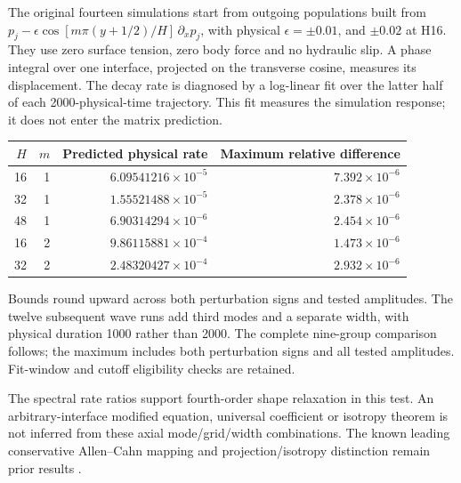 The original fourteen simulations start from outgoing populations built from
$p_j-\epsilon\cos[m\pi(y+1/2)/H]\,\partial_xp_j$, with physical
$\epsilon=\pm0.01$, and $\pm0.02$ at H16. They use zero surface tension,
zero body force and no hydraulic slip. A phase integral over one interface,
projected on the transverse cosine, measures its displacement. The decay
rate is diagnosed by a log-linear fit over the latter half of each
2000-physical-time trajectory. This fit measures the simulation response;
it does not enter the matrix prediction.

\begin{center}\small
\begin{tabular}{rrrr}\toprule
$H$ & $m$ & Predicted physical rate & Maximum relative difference \\\midrule
16 & 1 & $6.09541216\times10^{-5}$ & $7.392\times10^{-6}$ \\
32 & 1 & $1.55521488\times10^{-5}$ & $2.378\times10^{-6}$ \\
48 & 1 & $6.90314294\times10^{-6}$ & $2.454\times10^{-6}$ \\
16 & 2 & $9.86115881\times10^{-4}$ & $1.473\times10^{-6}$ \\
32 & 2 & $2.48320427\times10^{-4}$ & $2.932\times10^{-6}$ \\
\bottomrule\end{tabular}
\end{center}
Bounds round upward across both perturbation signs and tested amplitudes.
The twelve subsequent wave runs add third modes and a separate width,
with physical duration 1000 rather than 2000. The complete nine-group
comparison follows; the maximum includes both perturbation signs and
all tested amplitudes. Fit-window and cutoff eligibility checks are retained.


The spectral rate ratios support fourth-order shape relaxation in this
test. An arbitrary-interface modified equation, universal coefficient
or isotropy theorem is not inferred from these axial mode/grid/width combinations.
The known leading conservative Allen--Cahn mapping and projection/isotropy
distinction remain prior results \cite{subhedar2020}.

